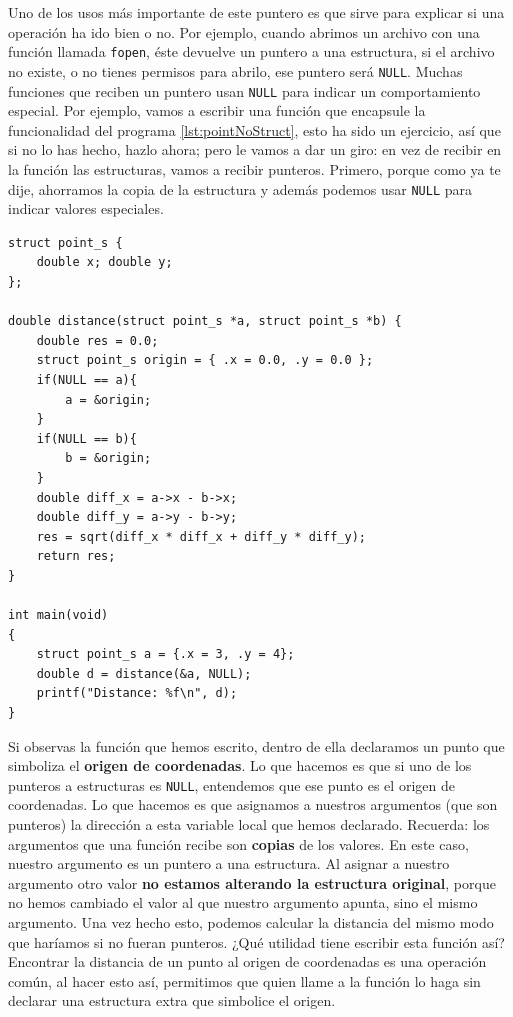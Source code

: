 \documentclass[a4paper]{article}
\begin{document}
Uno de los usos más importante de este puntero es que sirve para explicar si
una operación ha ido bien o no. Por ejemplo, cuando abrimos un archivo con una
función llamada \verb!fopen!, éste devuelve un puntero a una estructura, si
el archivo no existe, o no tienes permisos para abrilo, ese puntero será
\verb!NULL!.
Muchas funciones que reciben un puntero
usan \verb!NULL! para indicar un comportamiento especial. Por ejemplo, vamos a
escribir una función que encapsule la funcionalidad del programa
\ref{lst:pointNoStruct}, esto ha sido un ejercicio, así que si no lo has hecho,
hazlo ahora; pero le vamos a dar un giro: en vez de recibir en la función las
estructuras, vamos a recibir punteros. Primero, porque como ya te dije,
ahorramos la copia de la estructura y además podemos usar \verb|NULL| para
indicar valores especiales.

\noindent
\begin{minipage}[H]{\linewidth}
\mbox{}
\begin{lstlisting}[style=C, label={lst:nullPointers}, caption={Uso de punteros a \texttt{NULL}}]
struct point_s {
    double x; double y;
};

double distance(struct point_s *a, struct point_s *b) {
    double res = 0.0;
    struct point_s origin = { .x = 0.0, .y = 0.0 };
    if(NULL == a){
        a = &origin;
    }
    if(NULL == b){
        b = &origin;
    }
    double diff_x = a->x - b->x;
    double diff_y = a->y - b->y;
    res = sqrt(diff_x * diff_x + diff_y * diff_y);
    return res;
}

int main(void)
{
    struct point_s a = {.x = 3, .y = 4};
    double d = distance(&a, NULL);
    printf("Distance: %f\n", d);
}
\end{lstlisting}
\end{minipage}

Si observas la función que hemos escrito, dentro de ella declaramos un punto
que simboliza el \textbf{origen de coordenadas}. Lo que hacemos es que si
uno de los punteros a estructuras es \verb|NULL|, entendemos que ese punto
es el origen de coordenadas. Lo que hacemos es que asignamos a nuestros
argumentos (que son punteros) la dirección a esta variable local que hemos
declarado. Recuerda: los argumentos que una función recibe son \textbf{copias}
de los valores. En este caso, nuestro argumento es un puntero a una estructura.
Al asignar a nuestro argumento otro valor \textbf{no estamos alterando la
estructura original}, porque no hemos cambiado el valor al que nuestro argumento
apunta, sino el mismo argumento. Una vez hecho esto, podemos calcular la
distancia del mismo modo que haríamos si no fueran punteros. ¿Qué utilidad tiene
escribir esta función así? Encontrar la distancia de un punto al origen de
coordenadas es una operación común, al hacer esto así, permitimos que quien
llame a la función lo haga sin declarar una estructura extra que simbolice
el origen.
\end{document}
